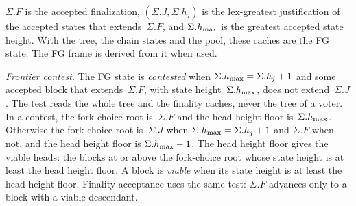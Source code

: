 $\Sigma.F$ is the accepted finalization, $(\Sigma.J,\Sigma.h_j)$ is the
lex-greatest justification of the accepted states that
extends~$\Sigma.F$, and $\Sigma.h_{\max}$ is the greatest accepted state
height.  With the tree, the chain states and the pool, these caches are the FG
state.  The FG frame is derived from it when used.

\emph{Frontier contest.}  The FG state is \emph{contested} when
$\Sigma.h_{\max}=\Sigma.h_j+1$ and some accepted block that
extends~$\Sigma.F$, with state height~$\Sigma.h_{\max}$, does not
extend~$\Sigma.J$.  The test reads the whole tree and the finality caches,
never the tree of a voter.  In a contest, the fork-choice root is~$\Sigma.F$ and the head height floor
is~$\Sigma.h_{\max}$.  Otherwise the fork-choice root is~$\Sigma.J$ when
$\Sigma.h_{\max}=\Sigma.h_j+1$ and $\Sigma.F$ when not, and the head height floor
is $\Sigma.h_{\max}-1$.  The head height floor gives the viable heads: the blocks
at or above the fork-choice root whose state height is at least the head height floor.
A block is \emph{viable} when its state height is at least the head height
floor.  Finality acceptance uses the same test: $\Sigma.F$ advances only to
a block with a viable descendant.

